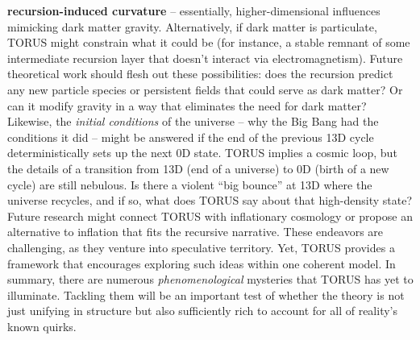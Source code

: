\documentclass[]{article}
\begin{document}
\begin{itemize}
  \textbf{recursion-induced curvature} -- essentially,
  higher-dimensional influences mimicking dark matter gravity​.
  Alternatively, if dark matter is particulate, TORUS might constrain
  what it could be (for instance, a stable remnant of some intermediate
  recursion layer that doesn't interact via electromagnetism​). Future
  theoretical work should flesh out these possibilities: does the
  recursion predict any new particle species or persistent fields that
  could serve as dark matter? Or can it modify gravity in a way that
  eliminates the need for dark matter? Likewise, the \emph{initial
  conditions} of the universe -- why the Big Bang had the conditions it
  did -- might be answered if the end of the previous 13D cycle
  deterministically sets up the next 0D state. TORUS implies a cosmic
  loop, but the details of a transition from 13D (end of a universe) to
  0D (birth of a new cycle) are still nebulous. Is there a violent ``big
  bounce'' at 13D where the universe recycles, and if so, what does
  TORUS say about that high-density state? Future research might connect
  TORUS with inflationary cosmology or propose an alternative to
  inflation that fits the recursive narrative. These endeavors are
  challenging, as they venture into speculative territory. Yet, TORUS
  provides a framework that encourages exploring such ideas within one
  coherent model. In summary, there are numerous \emph{phenomenological}
  mysteries that TORUS has yet to illuminate. Tackling them will be an
  important test of whether the theory is not just unifying in structure
  but also sufficiently rich to account for all of reality's known
  quirks.
\end{itemize}
\end{document}
